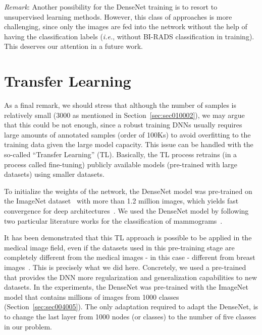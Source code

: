 \vspace{2mm}

\noindent
{\it Remark}: 
Another possibility for the DenseNet training is to resort to unsupervised learning  methods. However, this class of approaches is more challenging, since only the images are fed into the network without the help of having the classification labels ({\it i.e.}, without BI-RADS classification in training).
This deserves our attention in a future work.

\section{Transfer Learning}
\label{sec:app003003}

As a final remark, we should stress that although the  number of samples is relatively small (3000 as mentioned in Section~\ref{sec:sec010002}), we may argue that this could be not enough, since a robust training DNNs usually requires large amounts of annotated samples (order of 100Ks) to avoid overfitting to the training data given the large model capacity.
This issue can be handled with the so-called ``Transfer Learning'' (TL).
Basically, the TL process retrains (in a process called fine-tuning) publicly available models (pre-trained with large datasets) using smaller datasets.

To initialize the weights of the network, the DenseNet model was pre-trained on the ImageNet dataset~\cite{deng2009imagenet} with more than 1.2 million images, which yields fast convergence for deep architectures~\cite{8515234}.
We used the DenseNet model by following two particular literature works for the classification of mammograms~\cite{10.1007/978-3-030-88163-4_16, 10.1007/978-3-030-47679-3_23}.

It has been demonstrated that this TL approach is possible to be applied in the medical image field, even if the datasets used in this pre-training stage are completely different from the medical images - in this case - different from breast images~\cite{10.1007/978-3-319-24574-4_78, 8032490}.
This is precisely what we did here.
Concretely, we used a pre-trained that provides the DNN more regularization and generalization capabilities to new datasets.
In the experiments, the DenseNet was pre-trained with the  ImageNet model that contains millions of images from 1000 classes (Section~\ref{sec:sec004005}).
The only adaptation required  to adapt the DenseNet, is to change the last layer from 1000 nodes (or classes) to the number of five classes in our problem.

